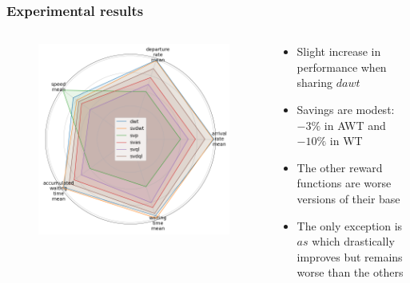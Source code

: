 \documentclass[dvipsnames]{beamer}
\begin{document}
\begin{frame}
\frametitle{Experimental results}
  \begin{columns}
  \begin{column}{0.5\textwidth}
    \begin{figure}
      \centering
      \includegraphics[width=1.0\textwidth]{figures/rew-sharing-radar.png}
    \end{figure}
  \end{column}
  \begin{column}{0.5\textwidth}
    \begin{itemize}
      \item Slight increase in performance when sharing $dawt$
      \item Savings are modest: $-3\%$ in AWT and $-10\%$ in WT
      \item The other reward functions are worse versions of their base
      \item The only exception is $as$ which drastically improves but remains worse than the others
    \end{itemize}
  \end{column}
\end{columns}
\end{frame}
\end{document}

